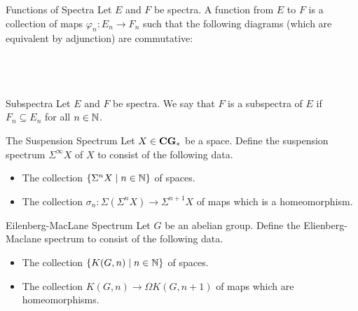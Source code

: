 \documentclass[a4paper]{article}
\begin{document}
\begin{defn}{Functions of Spectra}{} Let $E$ and $F$ be spectra. A function from $E$ to $F$ is a collection of maps $\varphi_n:E_n\to F_n$ such that the following diagrams (which are equivalent by adjunction) are commutative: \\~\\
\\~\\
\end{defn}

\begin{defn}{Subspectra}{} Let $E$ and $F$ be spectra. We say that $F$ is a subspectra of $E$ if $F_n\subseteq E_n$ for all $n\in\mathbb{N}$. 
\end{defn}

\begin{defn}{The Suspension Spectrum}{} Let $X\in\bold{CG}_\ast$ be a space. Define the suspension spectrum $\Sigma^\infty X$ of $X$ to consist of the following data. 
\begin{itemize}
\item The collection $\{\Sigma^n X\;|\;n\in\mathbb{N}\}$ of spaces. 
\item The collection $\sigma_n:\Sigma(\Sigma^nX)\to\Sigma^{n+1}X$ of maps which is a homeomorphism. 
\end{itemize}
\end{defn}

\begin{defn}{Eilenberg-MacLane Spectrum}{} Let $G$ be an abelian group. Define the Elienberg-Maclane spectrum to consist of the following data. 
\begin{itemize}
\item The collection $\{K(G,n)\;|\;n\in\mathbb{N}\}$ of spaces. 
\item The collection $K(G,n)\to\Omega K(G,n+1)$ of maps which are homeomorphisms. 
\end{itemize}
\end{defn}
\end{document}

